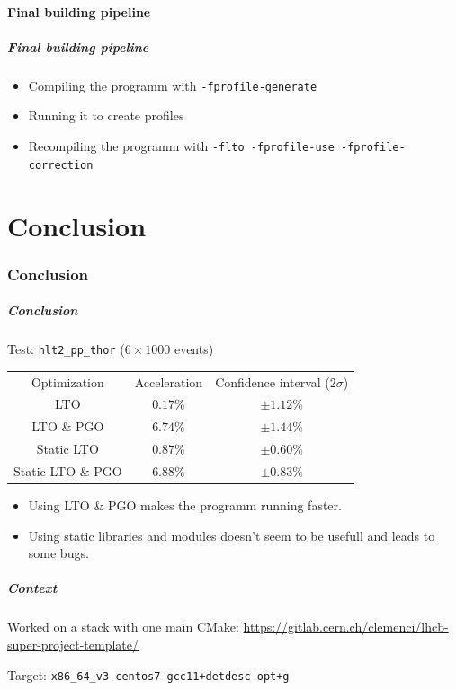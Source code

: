 \documentclass{beamer}
\begin{document}
    \subsection{Final building pipeline}

    \begin{frame}[fragile]
        \frametitle{Final building pipeline}

        \begin{itemize}
            \item Compiling the programm with \verb'-fprofile-generate'
            \item Running it to create profiles
            \item Recompiling the programm with \verb'-flto -fprofile-use -fprofile-correction'
        \end{itemize}
    \end{frame}

\part{Conclusion}
\section*{Conclusion}

    \begin{frame}[fragile]
        \frametitle{Conclusion}

        Test: \verb'hlt2_pp_thor' ($6 \times 1000$ events)
        \begin{center}
            \begin{tabular}{ c c c }
                Optimization & Acceleration & Confidence interval ($2\sigma$) \\
                LTO & $0.17\%$ & $\pm 1.12\%$ \\
                LTO \& PGO & $6.74\%$ & $\pm 1.44\%$ \\
                Static LTO & $0.87\%$ & $\pm 0.60\%$ \\
                Static LTO \& PGO & $6.88\%$ & $\pm 0.83\%$
            \end{tabular}
        \end{center}

        \begin{itemize}
            \item Using LTO \& PGO makes the programm running faster.
            \item Using static libraries and modules doesn't seem to be usefull and leads to some bugs.
        \end{itemize}
    \end{frame}

    \appendix

    \begin{frame}[fragile]
        \frametitle{Context}

        Worked on a stack with one main CMake:
        \scriptsize \url{https://gitlab.cern.ch/clemenci/lhcb-super-project-template/} \normalsize

        Target: \verb'x86_64_v3-centos7-gcc11+detdesc-opt+g'
    \end{frame}
\end{document}
